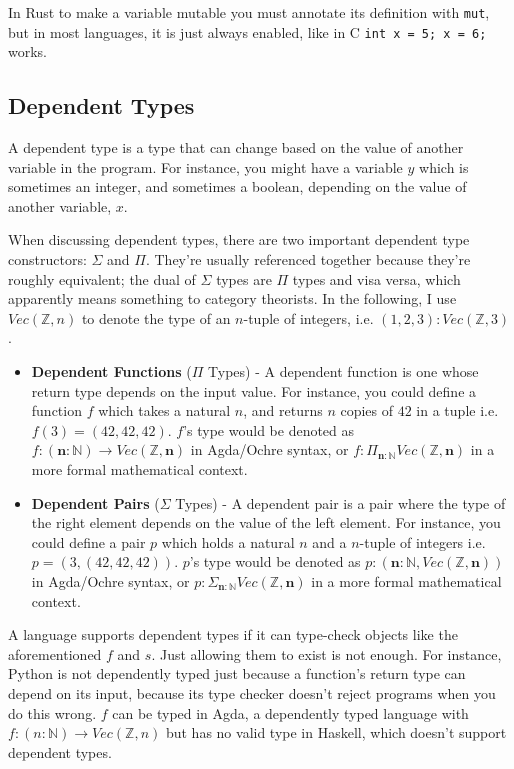 \documentclass[12pt,twoside]{report}
\begin{document}
In Rust to make a variable mutable you must annotate its definition with \verb|mut|, but in most languages, it is just always enabled, like in C \verb|int x = 5; x = 6;| works.

\subsection{Dependent Types}
A dependent type is a type that can change based on the value of another variable in the program. For instance, you might have a variable $y$ which is sometimes an integer, and sometimes a boolean, depending on the value of another variable, $x$.

When discussing dependent types, there are two important dependent type constructors: $\Sigma$ and $\Pi$. They're usually referenced together because they're roughly equivalent; the dual of $\Sigma$ types are $\Pi$ types and visa versa, which apparently means something to category theorists. In the following, I use $Vec(\mathbb{Z}, n)$ to denote the type of an $n$-tuple of integers, i.e. $(1, 2, 3): Vec(\mathbb{Z}, 3)$.

\begin{itemize}
  \item \textbf{Dependent Functions} ($\Pi$ Types) - A dependent function is one whose return type depends on the input value. For instance, you could define a function $f$ which takes a natural $n$, and returns $n$ copies of $42$ in a tuple i.e. $f(3) = (42, 42, 42)$. $f$'s type would be denoted as $f: (\textbf{n}: \mathbb{N}) \rightarrow Vec(\mathbb{Z}, \textbf{n})$ in Agda/Ochre syntax, or $f: \Pi_{\textbf{n}: \mathbb{N}} Vec(\mathbb{Z}, \textbf{n})$ in a more formal mathematical context.
  \item \textbf{Dependent Pairs} ($\Sigma$ Types) - A dependent pair is a pair where the type of the right element depends on the value of the left element. For instance, you could define a pair $p$ which holds a natural $n$ and a $n$-tuple of integers i.e. $p = (3, (42, 42, 42))$. $p$'s type would be denoted as $p: (\textbf{n}: \mathbb{N}, Vec(\mathbb{Z}, \textbf{n}))$ in Agda/Ochre syntax, or $p: \Sigma_{\textbf{n}: \mathbb{N}} Vec(\mathbb{Z}, \textbf{n})$ in a more formal mathematical context.
\end{itemize}

A language supports dependent types if it can type-check objects like the aforementioned $f$ and $s$. Just allowing them to exist is not enough. For instance, Python is not dependently typed just because a function's return type can depend on its input, because its type checker doesn't reject programs when you do this wrong. $f$ can be typed in Agda, a dependently typed language with $f: (n: \mathbb{N}) \rightarrow Vec(\mathbb{Z}, n)$ but has no valid type in Haskell, which doesn't support dependent types.
\end{document}

